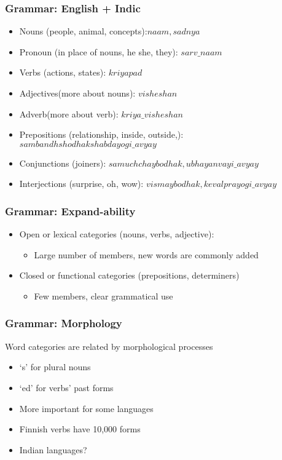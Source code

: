 \begin{frame}[fragile]
  \frametitle{Grammar: English + Indic}
       \begin{itemize}
	  \item Nouns (people, animal, concepts):$naam, sadnya$
	  \item Pronoun (in place of nouns, he she, they): $sarv\_  naam$
	  \item Verbs (actions, states): $kriyapad$
	  \item Adjectives(more about nouns): $visheshan$
	  \item Adverb(more about verb): $kriya\_ visheshan$
	  \item Prepositions (relationship, inside, outside,): $sambandh shodhak shabdayogi \_ avyay$
	  \item Conjunctions (joiners): $samuchchay bodhak, ubhayanvayi \_ avyay$
	  \item Interjections (surprise, oh, wow): $vismay bodhak, kevalprayogi\_ avyay$
	  	  \end{itemize}
\end{frame}


\begin{frame}[fragile]
  \frametitle{Grammar: Expand-ability}
  \begin{itemize}
  \item Open or lexical categories (nouns, verbs, adjective):
	    \begin{itemize}
	  \item Large number of members, new words are commonly added
	  \end{itemize}  
\item Closed or functional categories (prepositions, determiners)
	    \begin{itemize}
	  \item Few members, clear grammatical use
	  \end{itemize}  
  \end{itemize}
\end{frame}

\begin{frame}[fragile]
  \frametitle{Grammar: Morphology}
  Word categories are related by morphological processes
  \begin{itemize}
  \item `s' for plural nouns
  \item `ed' for verbs' past forms
  \item More important for some languages
  \item Finnish verbs have 10,000 forms
  \item Indian languages?
  \end{itemize}
\end{frame}

